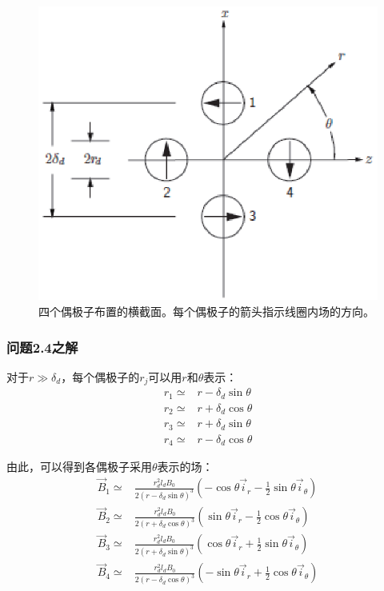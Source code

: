 \begin{figure}[htbp]
  \centering
 \includegraphics[scale=0.8]{chpt2/figs/fig2.7.eps}
  \caption{四个偶极子布置的横截面。每个偶极子的箭头指示线圈内场的方向。}
\end{figure}


\subsubsection*{问题2.4之解}
对于$r\gg \delta_d$，每个偶极子的$r_j$可以用$r$和$\theta$表示：
\begin{align}
r_1\simeq& r-\delta_d \sin\theta \nonumber\tag{S4.1a}\\
r_2\simeq& r+\delta_d \cos\theta\nonumber\tag{S4.1b}\\
r_3\simeq& r+\delta_d \sin\theta\nonumber\tag{S4.1c}\\
r_4\simeq& r-\delta_d \cos\theta\nonumber\tag{S4.1d}
\end{align}

由此，可以得到各偶极子采用$\theta$表示的场：
\begin{align}
\vec{B}_1 \simeq& \frac{r_d^2 l_d B_0}{2(r-\delta_d\sin\theta)^3}(-\cos\theta \vec{i}_r-\frac{1}{2}\sin\theta \vec{i}_\theta) \nonumber\tag{S4.2a}\\
\vec{B}_2 \simeq& \frac{r_d^2 l_d B_0}{2(r+\delta_d\cos\theta)^3}(\sin\theta \vec{i}_r-\frac{1}{2}\cos\theta \vec{i}_\theta)  \nonumber\tag{S4.2b}\\
\vec{B}_3 \simeq& \frac{r_d^2 l_d B_0}{2(r+\delta_d\sin\theta)^3}(\cos\theta \vec{i}_r+\frac{1}{2}\sin\theta \vec{i}_\theta) \nonumber\tag{S4.2c}\\
\vec{B}_4 \simeq& \frac{r_d^2 l_d B_0}{2(r-\delta_d\cos\theta)^3}(-\sin\theta \vec{i}_r+\frac{1}{2}\cos\theta \vec{i}_\theta)  \nonumber\tag{S4.2d}
\end{align}


